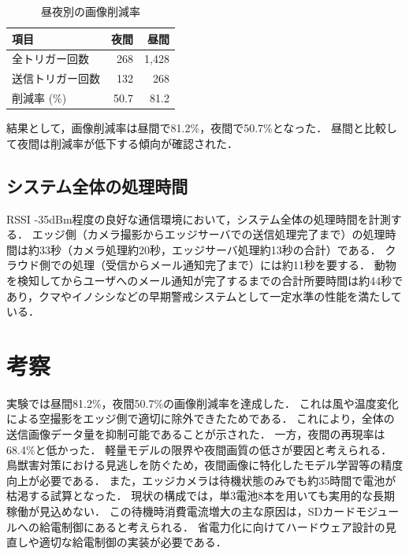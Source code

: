 \documentclass[technicalreport]{ieicej}
\begin{document}
\begin{table}[tb]
    \caption{昼夜別の画像削減率}
    \label{tab:comm_reduction}
    \centering
    \begin{tabular}{l|r|r}
        \hline
        項目       & 夜間   & 昼間    \\
        \hline \hline
        全トリガー回数  & 268  & 1,428 \\
        送信トリガー回数 & 132  & 268   \\
        削減率 (\%) & 50.7 & 81.2  \\
        \hline
    \end{tabular}
\end{table}

結果として，画像削減率は昼間で81.2\%，夜間で50.7\%となった．
昼間と比較して夜間は削減率が低下する傾向が確認された．

\subsection{システム全体の処理時間}
RSSI -35dBm程度の良好な通信環境において，システム全体の処理時間を計測する．
エッジ側（カメラ撮影からエッジサーバでの送信処理完了まで）の処理時間は約33秒（カメラ処理約20秒，エッジサーバ処理約13秒の合計）である．
クラウド側での処理（受信からメール通知完了まで）には約11秒を要する．
動物を検知してからユーザへのメール通知が完了するまでの合計所要時間は約44秒であり，クマやイノシシなどの早期警戒システムとして一定水準の性能を満たしている．

\section{考察}

実験では昼間81.2\%，夜間50.7\%の画像削減率を達成した．
これは風や温度変化による空撮影をエッジ側で適切に除外できたためである．
これにより，全体の送信画像データ量を抑制可能であることが示された．
一方，夜間の再現率は68.4\%と低かった．
軽量モデルの限界や夜間画質の低さが要因と考えられる．
鳥獣害対策における見逃しを防ぐため，夜間画像に特化したモデル学習等の精度向上が必要である．
また，エッジカメラは待機状態のみでも約35時間で電池が枯渇する試算となった．
現状の構成では，単3電池8本を用いても実用的な長期稼働が見込めない．
この待機時消費電流増大の主な原因は，SDカードモジュールへの給電制御にあると考えられる．
省電力化に向けてハードウェア設計の見直しや適切な給電制御の実装が必要である．
\end{document}

